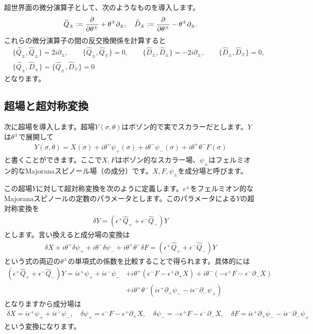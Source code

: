 \documentclass[report,paper=a4, fontsize=12pt, line_length=16cm, number_of_lines=33,dvipdfmx]{jlreq}
\numberwithin{equation}{chapter}
\numberwithin{equation}{section}
\newcommand{\del}{\partial}
\newcommand{\Qd}{\widehat{Q}}
\newcommand{\Dd}{\widehat{D}}
\begin{document}
超世界面の微分演算子として、次のようなものを導入します。
\begin{align}
  \Qd_{\pm}:=\pdv{\theta^{\pm}}+\theta^{\pm}\del_{\pm},\quad
  \Dd_{\pm}:=\pdv{\theta^{\pm}}-\theta^{\pm}\del_{\pm}.
\end{align}
これらの微分演算子の間の反交換関係を計算すると
\begin{align}
&  \{\Qd_{\pm},\Qd_{\pm}\}=2i\del_{\pm},\qquad 
  \{\Qd_{\pm},\Qd_{\mp}\}=0,\qquad 
  \{\Dd_{\pm},\Dd_{\pm}\}=-2i\del_{\pm},\qquad 
  \{\Dd_{\pm},\Dd_{\mp}\}=0,\nonumber\\
& \{\Qd_{\pm},\Dd_{\pm}\}=\{\Qd_{\pm},\Dd_{\mp}\}=0
\end{align}
となります。

\subsection{超場と超対称変換}
次に超場を導入します。超場$Y(\sigma,\theta)$はボゾン的で実でスカラーだとします。$Y$は$\theta^{\pm}$で展開して
\begin{align}
  Y(\sigma,\theta)=X(\sigma)+i\theta^{+}\psi_{+}(\sigma)+i\theta^{-}\psi_{-}(\sigma)+i\theta^{+}\theta^{-}F(\sigma)
\end{align}
と書くことができます。ここで$X,F$はボゾン的なスカラー場、$\psi_{\pm}$はフェルミオン的なMajoranaスピノール場（の成分）です。$X,F,\psi_{\pm}$を成分場と呼びます。

この超場$Y$に対して超対称変換を次のように定義します。$\epsilon^{\pm}$をフェルミオン的なMajoranaスピノールの定数のパラメータとします。このパラメータによる$Y$の超対称変換を
\begin{align}
  \delta Y = (\epsilon^{+}\Qd_{+}+\epsilon^{-}\Qd_{-})Y\label{superfieldtransf}
\end{align}
とします。言い換えると成分場の変換は
\begin{align}
  \delta X+i\theta^{+}\delta \psi_{+}+i\theta^{-}\delta \psi_{-}+i\theta^{+}\theta^{-}\delta F = (\epsilon^{+}\Qd_{+}+\epsilon^{-}\Qd_{-})Y
\end{align}
という式の両辺の$\theta^{\pm}$の単項式の係数を比較することで得られます。具体的には
\begin{align}
  (\epsilon^{+}\Qd_{+}+\epsilon^{-}\Qd_{-})Y=i\epsilon^{+}\psi_{+}+i\epsilon^{-}\psi_{-} 
  &+ i\theta^{+}(\epsilon^{-}F-\epsilon^{+}\del_{+}X)
  + i\theta^{-}(-\epsilon^{+}F-\epsilon^{-}\del_{-}X)\nonumber\\
  &+i\theta^{+}\theta^{-}
  (i\epsilon^{+}\del_{+}\psi_{-}-i\epsilon^{-}\del_{-}\psi_{+})
\end{align}
となりますから成分場は
\begin{align}
  \delta X=i\epsilon^{+}\psi_{+}+i\epsilon^{-}\psi_{-} ,\quad
  \delta \psi_{+}=\epsilon^{-}F-\epsilon^{+}\del_{+}X,\quad
  \delta \psi_{-}=-\epsilon^{+}F-\epsilon^{-}\del_{-}X,\quad
  \delta F=i\epsilon^{+}\del_{+}\psi_{-}-i\epsilon^{-}\del_{-}\psi_{+}
\end{align}
という変換になります。
\end{document}
